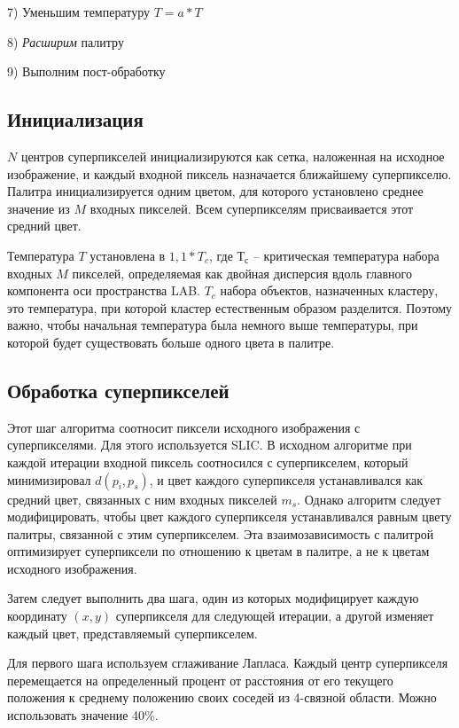 \documentclass[a4paper,12pt]{report}
\begin{document}
7)          Уменьшим температуру $T = a*T$

8)          \textit{Расширим} палитру

9)  Выполним пост-обработку

\subsection{Инициализация}

$N$ центров суперпикселей инициализируются как сетка, наложенная на исходное изображение, и каждый входной пиксель назначается ближайшему суперпикселю. Палитра инициализируется одним цветом, для которого установлено среднее значение из $M$ входных пикселей. Всем суперпикселям присваивается этот средний цвет.

Температура $T$ установлена в $1,1*T_c$, где $Т_с$ – критическая температура набора входных $M$ пикселей, определяемая как двойная дисперсия вдоль главного компонента оси пространства LAB. $T_c$ набора объектов, назначенных кластеру, это температура, при которой кластер естественным образом разделится. Поэтому важно, чтобы начальная температура была немного выше температуры, при которой будет существовать больше одного цвета в палитре.

\subsection{Обработка суперпикселей}

Этот шаг алгоритма соотносит пиксели исходного изображения с суперпикселями. Для этого используется SLIC. В исходном алгоритме при каждой итерации входной пиксель соотносился с суперпикселем, который минимизировал $d(p_i, p_s)$, и цвет каждого суперпикселя устанавливался как средний цвет, связанных с ним входных пикселей $m_s$. Однако алгоритм следует модифицировать, чтобы цвет каждого суперпикселя устанавливался равным цвету палитры, связанной с этим суперпикселем. Эта взаимозависимость с палитрой оптимизирует суперпиксели по отношению к цветам в палитре, а не к цветам исходного изображения.

Затем следует выполнить два шага, один из которых модифицирует каждую координату $(x, y)$ суперпикселя для следующей итерации, а другой изменяет каждый цвет, представляемый суперпикселем.

Для первого шага используем сглаживание Лапласа. Каждый центр суперпикселя перемещается на определенный процент от расстояния от его текущего положения к среднему положению своих соседей из 4-связной области. Можно использовать значение 40\%.
\end{document}
